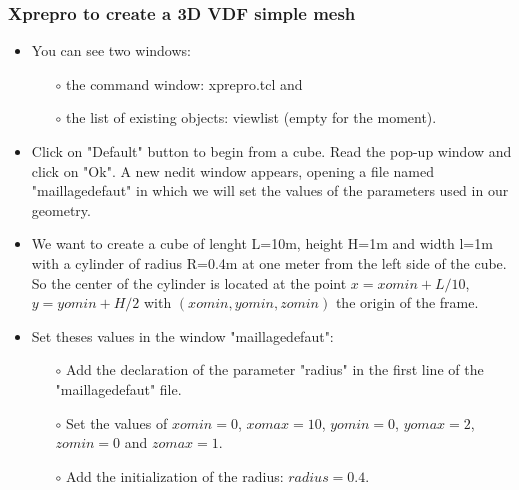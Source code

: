 \documentclass[10pt, hyperref={unicode=true,pdfusetitle, bookmarks=true,bookmarksnumbered=false,bookmarksopen=false, breaklinks=false,pdfborder={0 0 1},backref=true,colorlinks=true,linkcolor=darkblue,pageanchor}]{beamer}
\begin{document}
\begin{frame}
\frametitle{Xprepro to create a 3D VDF simple mesh}
\begin{block}{}

\begin{itemize}
\item You can see two windows: 
    \begin{itemize}
    \item [$\circ$] the command window: xprepro.tcl and 
    \item [$\circ$] the list of existing objects: viewlist (empty for the moment).
    \end{itemize}
\item Click on "Default" button to begin from a cube. Read the pop-up window and click on "Ok". A new nedit window appears, opening a file named "maillagedefaut" in which we will set the values of the parameters used in our geometry.
\item We want to create a cube of lenght L=10m, height H=1m and width l=1m with a cylinder of radius R=0.4m at one meter from the left side of the cube. So the center of the cylinder is located at the point $x=xomin+L/10$, $y=yomin+H/2$ with $(xomin, yomin, zomin)$ the origin of the frame.
\item Set theses values in the window "maillagedefaut":
\begin{itemize}
    \item [$\circ$] Add the declaration of the parameter "radius" in the first line of the "maillagedefaut" file.
    \item [$\circ$] Set the values of $xomin=0$, $xomax=10$, $yomin=0$, $yomax=2$, $zomin=0$ and $zomax=1$.
    \item [$\circ$] Add the initialization of the radius: $radius=0.4$.
\end{itemize}
\end{itemize}

\end{block}
\end{frame}
\end{document}
